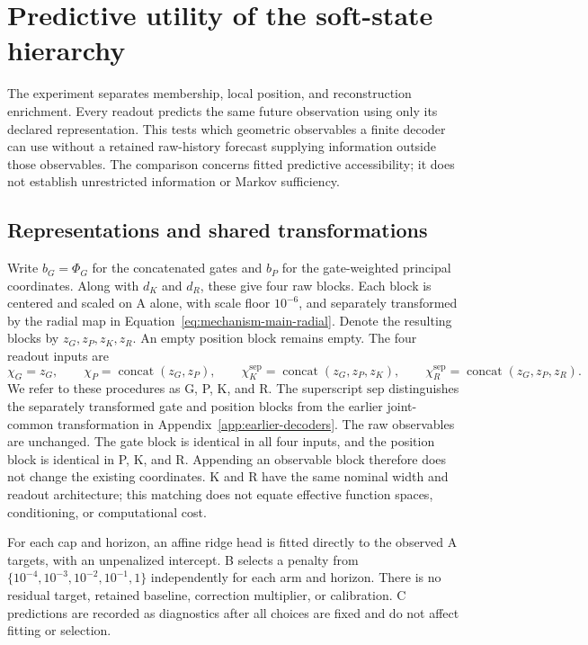 \section{Predictive utility of the soft-state hierarchy}
\label{sec:softstate-study}

The experiment separates membership, local position, and
reconstruction enrichment. Every readout predicts the same future
observation using only its declared representation. This tests which
geometric observables a finite decoder can use without a retained
raw-history forecast supplying information outside those observables.
The comparison concerns fitted predictive accessibility; it does not
establish unrestricted information or Markov sufficiency.

\subsection{Representations and shared transformations}

Write $b_G=\Phi_G$ for the concatenated gates and $b_P$ for the
gate-weighted principal coordinates. Along with $d_K$ and $d_R$, these
give four raw blocks. Each block is centered and scaled on A alone,
with scale floor $10^{-6}$, and separately transformed by the radial
map in Equation~\eqref{eq:mechanism-main-radial}. Denote the resulting
blocks by $z_G,z_P,z_K,z_R$. An empty position block remains empty.
The four readout inputs are
\begin{equation}
 \chi_G=z_G,\qquad
 \chi_P=\operatorname{concat}(z_G,z_P),\qquad
 \chi_K^{\mathrm{sep}}=\operatorname{concat}(z_G,z_P,z_K),\qquad
 \chi_R^{\mathrm{sep}}=\operatorname{concat}(z_G,z_P,z_R).
 \label{eq:softstate-four-arms}
\end{equation}
We refer to these procedures as G, P, K, and R. The superscript
$\mathrm{sep}$ distinguishes the separately transformed gate and
position blocks from the earlier joint-common transformation in
Appendix~\ref{app:earlier-decoders}. The raw observables are unchanged.
The gate block is identical in all four inputs, and the position block
is identical in P, K, and R. Appending an observable block therefore
does not change the existing coordinates. K and R have the same nominal
width and readout architecture; this matching does not equate effective
function spaces, conditioning, or computational cost.

For each cap and horizon, an affine ridge head is fitted directly to the
observed A targets, with an unpenalized intercept. B selects a penalty
from $\{10^{-4},10^{-3},10^{-2},10^{-1},1\}$ independently for each arm
and horizon. There is no residual target, retained baseline, correction
multiplier, or calibration. C predictions are recorded as diagnostics
after all choices are fixed and do not affect fitting or selection.

